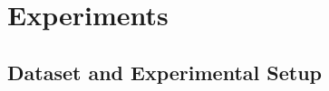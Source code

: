 \documentclass[10pt,twocolumn,letterpaper]{article}
\begin{document}

\section{Experiments}
\label{sec:exp}

\subsection{Dataset and Experimental Setup}
\label{sec:dataset}
\end{document}
